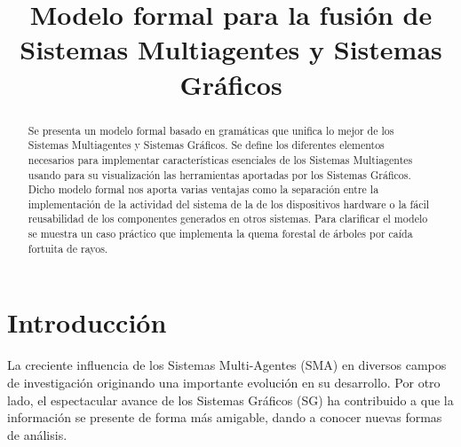 \documentclass[runningheads]{llncs}
\begin{document}
\mainmatter

\title{Modelo formal para la fusi\'on de Sistemas Multiagentes y Sistemas Gr\'aficos}

\author{}%
\authorrunning{}%

\institute{}%


\maketitle


\begin{abstract}
Se presenta un modelo formal basado en gram\'aticas que unifica lo mejor de los Sistemas Multiagentes y Sistemas Gr\'aficos. Se define los diferentes elementos necesarios para implementar caracter\'isticas esenciales de los Sistemas Multiagentes usando para su visualizaci\'on las herramientas aportadas por los Sistemas Gr\'aficos. Dicho modelo formal nos aporta varias ventajas como la separaci\'on entre la implementaci\'on de la actividad del sistema de la de los dispositivos hardware o la f\'acil reusabilidad de los componentes generados en otros sistemas. Para clarificar el modelo se muestra un caso pr\'actico que implementa la quema forestal de \'arboles por ca\'ida fortuita de rayos.

\end{abstract}


\section{Introducci\'on\label{sec:Introduccion}}

La creciente influencia de los Sistemas Multi-Agentes (SMA) en diversos campos de investigaci\'on originando una importante evoluci\'on en su desarrollo. Por otro lado, el espectacular avance de los Sistemas Gr\'aficos (SG) ha contribuido a que la informaci\'on se presente de forma m\'as amigable, dando a conocer nuevas formas de an\'alisis.
\end{document}
